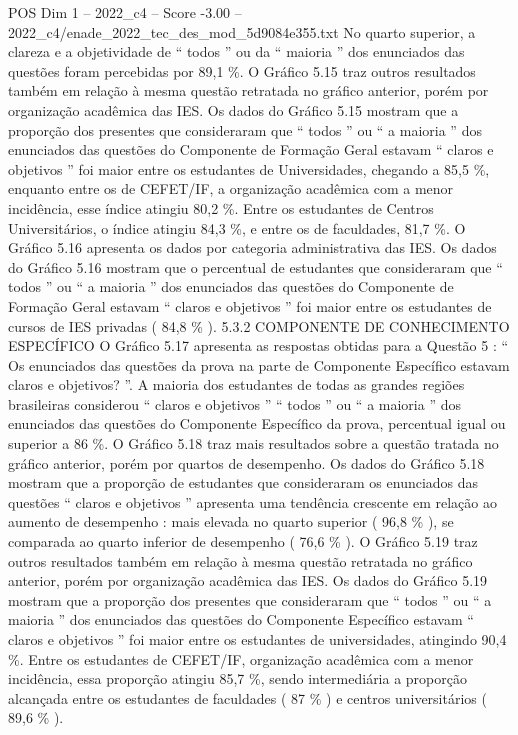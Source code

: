 \begin{textsample}{POS Dim 1 – 2022\_c4 – Score -3.00 – 2022\_c4/enade\_2022\_tec\_des\_mod\_5d9084e355.txt}
No quarto superior, a clareza e a objetividade de “ todos ” ou da “ maioria ” dos enunciados das questões foram percebidas por 89,1 \%.
O Gráfico 5.15 traz outros resultados também em relação à mesma questão retratada no gráfico anterior, porém por organização acadêmica das IES.
Os dados do Gráfico 5.15 mostram que a proporção dos presentes que consideraram que “ todos ” ou “ a maioria ” dos enunciados das questões do Componente de Formação Geral estavam “ claros e objetivos ” foi maior entre os estudantes de Universidades, chegando a 85,5 \%, enquanto entre os de CEFET/IF, a organização acadêmica com a menor incidência, esse índice atingiu 80,2 \%.
Entre os estudantes de Centros Universitários, o índice atingiu 84,3 \%, e entre os de faculdades, 81,7 \%.
O Gráfico 5.16 apresenta os dados por categoria administrativa das IES.
Os dados do Gráfico 5.16 mostram que o percentual de estudantes que consideraram que “ todos ” ou “ a maioria ” dos enunciados das questões do Componente de Formação Geral estavam “ claros e objetivos ” foi maior entre os estudantes de cursos de IES privadas ( 84,8 \% ). 5.3.2 COMPONENTE DE CONHECIMENTO ESPECÍFICO O Gráfico 5.17 apresenta as respostas obtidas para a Questão 5 : “ Os enunciados das questões da prova na parte de Componente Específico estavam claros e objetivos? ”.
A maioria dos estudantes de todas as grandes regiões brasileiras considerou “ claros e objetivos ” “ todos ” ou “ a maioria ” dos enunciados das questões do Componente Específico da prova, percentual igual ou superior a 86 \%.
O Gráfico 5.18 traz mais resultados sobre a questão tratada no gráfico anterior, porém por quartos de desempenho.
Os dados do Gráfico 5.18 mostram que a proporção de estudantes que consideraram os enunciados das questões “ claros e objetivos ” apresenta uma tendência crescente em relação ao aumento de desempenho : mais elevada no quarto superior ( 96,8 \% ), se comparada ao quarto inferior de desempenho ( 76,6 \% ).
O Gráfico 5.19 traz outros resultados também em relação à mesma questão retratada no gráfico anterior, porém por organização acadêmica das IES.
Os dados do Gráfico 5.19 mostram que a proporção dos presentes que consideraram que “ todos ” ou “ a maioria ” dos enunciados das questões do Componente Específico estavam “ claros e objetivos ” foi maior entre os estudantes de universidades, atingindo 90,4 \%.
Entre os estudantes de CEFET/IF, organização acadêmica com a menor incidência, essa proporção atingiu 85,7 \%, sendo intermediária a proporção alcançada entre os estudantes de faculdades ( 87 \% ) e centros universitários ( 89,6 \% ).

\end{textsample}
